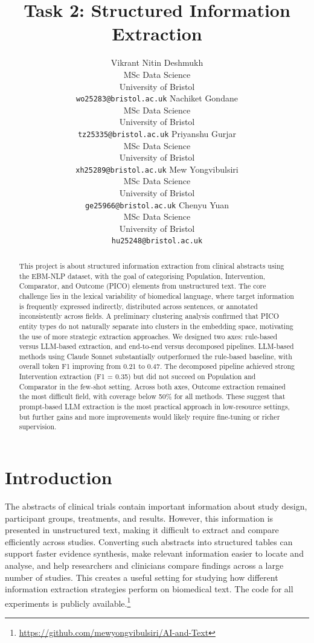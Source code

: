 \documentclass{article}
\title{Task 2: Structured Information Extraction}
\author{%
  Vikrant Nitin Deshmukh \\
  MSc Data Science \\
  University of Bristol \\
  \texttt{wo25283@bristol.ac.uk}
  \And
  Nachiket Gondane \\
  MSc Data Science \\
  University of Bristol \\
  \texttt{tz25335@bristol.ac.uk}
  \And
  Priyanshu Gurjar \\
  MSc Data Science \\
  University of Bristol \\
  \texttt{xh25289@bristol.ac.uk}
  \AND
  Mew Yongvibulsiri \\
  MSc Data Science \\
  University of Bristol \\
  \texttt{ge25966@bristol.ac.uk}
  \And
  Chenyu Yuan \\
  MSc Data Science \\
  University of Bristol \\
  \texttt{hu25248@bristol.ac.uk}
}
\begin{document}
\raggedbottom

\maketitle

\begin{abstract}
  This project is about structured information extraction from clinical abstracts using the EBM-NLP dataset, with the goal of categorising Population, Intervention, Comparator, and Outcome (PICO) elements from unstructured text. The core challenge lies in the lexical variability of biomedical language, where target information is frequently expressed indirectly, distributed across sentences, or annotated inconsistently across fields. A preliminary clustering analysis confirmed that PICO entity types do not naturally separate into clusters in the embedding space, motivating the use of more strategic extraction approaches. We designed two axes: rule-based versus LLM-based extraction, and end-to-end versus decomposed pipelines. LLM-based methods using Claude Sonnet substantially outperformed the rule-based baseline, with overall token F1 improving from 0.21 to 0.47. The decomposed pipeline achieved strong Intervention extraction (F1 = 0.35) but did not succeed on Population and Comparator in the few-shot setting. Across both axes, Outcome extraction remained the most difficult field, with coverage below 50\% for all methods. These suggest that prompt-based LLM extraction is the most practical approach in low-resource settings, but further gains and more improvements would likely require fine-tuning or richer supervision.
\end{abstract}



\section{Introduction}
The abstracts of clinical trials contain important information about study design, participant groups, treatments, and results. However, this information is presented in unstructured text, making it difficult to extract and compare efficiently across studies. Converting such abstracts into structured tables can support faster evidence synthesis, make relevant information easier to locate and analyse, and help researchers and clinicians compare findings across a large number of studies. This creates a useful setting for studying how different information extraction strategies perform on biomedical text. The code for all experiments is publicly available.\footnote{\url{https://github.com/mewyongvibulsiri/AI-and-Text}}
\end{document}
